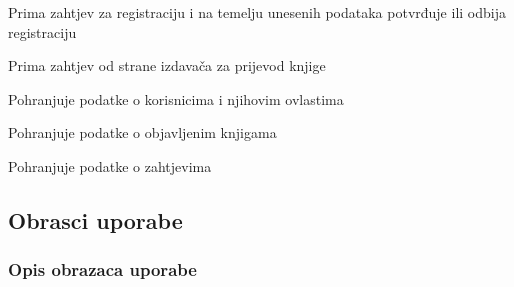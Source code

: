 \begin{packed_enum}
                			\item {}
                			\begin{packed_enum}
                    				\item Prima zahtjev za registraciju i na temelju unesenih podataka potvrđuje ili odbija registraciju
                			\end{packed_enum}

                			\item {}
                			\begin{packed_enum}
                    				\item Prima zahtjev od strane izdavača za prijevod knjige
                			\end{packed_enum}

                			\item {}
                			\begin{packed_enum}
                    				\item Pohranjuje podatke o korisnicima i njihovim ovlastima
                    				\item Pohranjuje podatke o objavljenim knjigama
					\item Pohranjuje podatke o zahtjevima
                			\end{packed_enum}
			\end{packed_enum}
			
			\eject 
			
			
			\subsection{Obrasci uporabe}
				

				
				\subsubsection{Opis obrazaca uporabe}				
					\noindent {}
            
